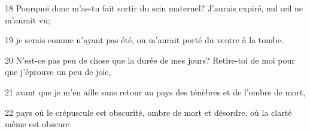 18 Pourquoi donc m’as-tu fait sortir du sein maternel? J’aurais expiré, nul œil ne m’aurait vu;

19 je serais comme n’ayant pas été, on m’aurait porté du ventre à la tombe.

20 N’est-ce pas peu de chose que la durée de mes jours? Retire-toi de moi pour que j’éprouve un peu de joie,

21 avant que je m’en aille sans retour au pays des ténèbres et de l’ombre de mort,

22 pays où le crépuscule est obscurité, ombre de mort et désordre, où la clarté même est obscure.
